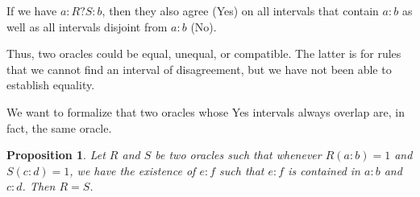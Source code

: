 \documentclass[12pt]{article}
\newtheorem{proposition}{Proposition}[subsection]
\theoremstyle{remark}
\begin{document}
If we have $a:R?S:b$, then they also agree (Yes) on all intervals that contain $a:b$ as well as all intervals disjoint from $a:b$ (No). 

Thus, two oracles could be equal, unequal, or compatible. The latter is for rules that we cannot find an interval of disagreement, but we have not been able to establish equality. 

We want to formalize that two oracles whose Yes intervals always overlap are, in fact, the same oracle.

\begin{proposition}\label{pr:overlap}
Let $R$ and $S$ be two oracles such that whenever $R(a:b)=1$ and $S(c:d)=1$, we have the existence of $e:f$ such that $e:f$ is contained in $a:b$ and $c:d$.  Then $R =S$.
\end{proposition}
\end{document}
